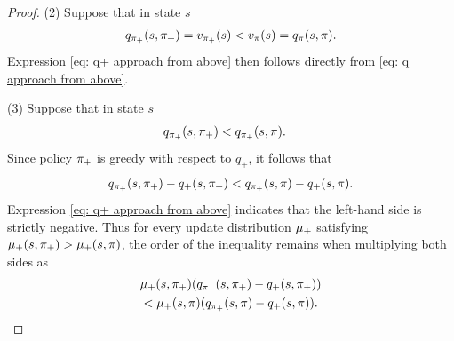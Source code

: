 \begin{proof}
(2) Suppose that in state $s$
\begin{align*}
    q_{\pi_+}(s, \pi_+) = v_{\pi_+}(s) < v_{\pi}(s) = q_{\pi}(s, \pi) .
\end{align*}
Expression \eqref{eq: q+ approach from above} then follows directly from \eqref{eq: q approach from above}.


(3) Suppose that in state $s$
\begin{align}
    \label{eq: cond on qpol+}
    &q_{\pi_+}(s, \pi_+) < q_{\pi_+}(s, \pi) .
\end{align}
Since policy $\pi_+$ is greedy with respect to $q_+$, it follows that
\begin{align}
    q_{\pi_+}(s, \pi_+) - q_+(s, \pi_+) 
    < q_{\pi_+}(s, \pi) - q_+(s, \pi) .
\end{align}
Expression \eqref{eq: q+ approach from above} indicates that the left-hand side is strictly negative. 
Thus for every update distribution $\mu_+$ satisfying $\mu_+(s, \pi_+) > \mu_+(s, \pi)$, the order of the inequality remains when multiplying both sides as
\begin{multline*}
    \mu_+(s, \pi_+) (q_{\pi_+}(s, \pi_+) - q_{+}(s, \pi_+))
    \\
    < 
    \mu_+(s, \pi) ( q_{\pi_+}(s, \pi) - q_{+}(s, \pi) ) .
\end{multline*}
\end{proof}


